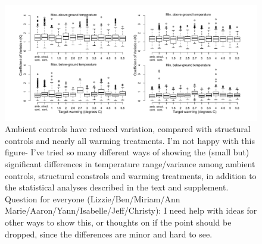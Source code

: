 \documentclass{article}
\begin{document}
\begin{figure}[p]
\centering
\includegraphics{../Analyses/figures/DRAFT_CVBytreatment.pdf} 
\caption{Ambient controls have reduced variation, compared with structural controls and nearly all warming treatments. I'm not happy with this figure- I've tried so many different ways of showing the (small but) significant differences in temperature range/variance among ambient controls, structural constrols and warming treatments, in addition to the statistical analyses described in the text and supplement. Question for everyone (Lizzie/Ben/Miriam/Ann Marie/Aaron/Yann/Isabelle/Jeff/Christy): I need help with ideas for other ways to show this, or thoughts on if the point should be dropped, since the differences are minor and hard to see.} %
 \label{fig:cv}
 \end{figure}
\clearpage
\end{document}
